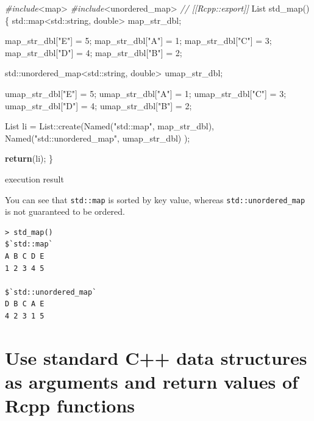 \documentclass[]{book}
\newenvironment{Shaded}{\begin{snugshade}}{\end{snugshade}}
\newcommand{\BuiltInTok}[1]{#1}
\newcommand{\CommentTok}[1]{\textcolor[rgb]{0.56,0.35,0.01}{\textit{#1}}}
\newcommand{\ControlFlowTok}[1]{\textcolor[rgb]{0.13,0.29,0.53}{\textbf{#1}}}
\newcommand{\DataTypeTok}[1]{\textcolor[rgb]{0.13,0.29,0.53}{#1}}
\newcommand{\DecValTok}[1]{\textcolor[rgb]{0.00,0.00,0.81}{#1}}
\newcommand{\ImportTok}[1]{#1}
\newcommand{\NormalTok}[1]{#1}
\newcommand{\PreprocessorTok}[1]{\textcolor[rgb]{0.56,0.35,0.01}{\textit{#1}}}
\newcommand{\StringTok}[1]{\textcolor[rgb]{0.31,0.60,0.02}{#1}}
\begin{document}
\begin{Shaded}
\begin{Highlighting}[]
\PreprocessorTok{#include}\ImportTok{<map>}
\PreprocessorTok{#include}\ImportTok{<unordered_map>}
\CommentTok{// [[Rcpp::export]]}
\NormalTok{List std_map()\{}
  \BuiltInTok{std::}\NormalTok{map<}\BuiltInTok{std::}\NormalTok{string, }\DataTypeTok{double}\NormalTok{> map_str_dbl;}
  
\NormalTok{  map_str_dbl[}\StringTok{"E"}\NormalTok{] = }\DecValTok{5}\NormalTok{;    }
\NormalTok{  map_str_dbl[}\StringTok{"A"}\NormalTok{] = }\DecValTok{1}\NormalTok{;}
\NormalTok{  map_str_dbl[}\StringTok{"C"}\NormalTok{] = }\DecValTok{3}\NormalTok{;    }
\NormalTok{  map_str_dbl[}\StringTok{"D"}\NormalTok{] = }\DecValTok{4}\NormalTok{;}
\NormalTok{  map_str_dbl[}\StringTok{"B"}\NormalTok{] = }\DecValTok{2}\NormalTok{;}
  
  \BuiltInTok{std::}\NormalTok{unordered_map<}\BuiltInTok{std::}\NormalTok{string, }\DataTypeTok{double}\NormalTok{> umap_str_dbl;}

\NormalTok{  umap_str_dbl[}\StringTok{"E"}\NormalTok{] = }\DecValTok{5}\NormalTok{;    }
\NormalTok{  umap_str_dbl[}\StringTok{"A"}\NormalTok{] = }\DecValTok{1}\NormalTok{;}
\NormalTok{  umap_str_dbl[}\StringTok{"C"}\NormalTok{] = }\DecValTok{3}\NormalTok{;    }
\NormalTok{  umap_str_dbl[}\StringTok{"D"}\NormalTok{] = }\DecValTok{4}\NormalTok{;}
\NormalTok{  umap_str_dbl[}\StringTok{"B"}\NormalTok{] = }\DecValTok{2}\NormalTok{;}
  
\NormalTok{  List li = List::create(Named(}\StringTok{"std::map"}\NormalTok{, map_str_dbl),}
\NormalTok{                         Named(}\StringTok{"std::unordered_map"}\NormalTok{, umap_str_dbl)}
\NormalTok{                        );}
  
  \ControlFlowTok{return}\NormalTok{(li);}
\NormalTok{\}}
\end{Highlighting}
\end{Shaded}

execution result

You can see that \texttt{std::map} is sorted by key value, whereas \texttt{std::unordered\_map} is not guaranteed to be ordered.

\begin{verbatim}
> std_map()
$`std::map`
A B C D E 
1 2 3 4 5 

$`std::unordered_map`
D B C A E 
4 2 3 1 5 
\end{verbatim}

\hypertarget{use-standard-c-data-structures-as-arguments-and-return-values-of-rcpp-functions}{%
\section{Use standard C++ data structures as arguments and return values of Rcpp functions}\label{use-standard-c-data-structures-as-arguments-and-return-values-of-rcpp-functions}}
\end{document}
